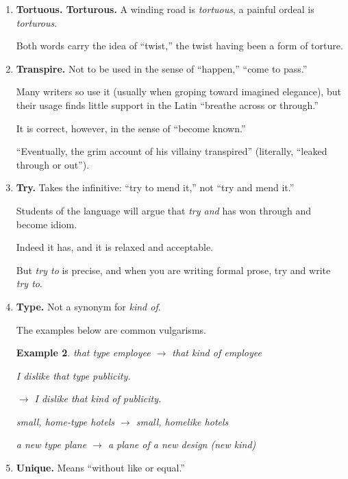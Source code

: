 \documentclass{article}
\newtheorem{example}{Example}
\begin{document}
\begin{enumerate}
	Use it sparingly.
	
	Save it for specific application.
	\begin{example}
		Our reorganization plan has a tremendous thrust.
		
		$\to$ The piston has a 5-inch thrust.
		
		The thrust of his letter was that he was working more hours than he'd bargained for.
		
		$\to$ The point he made in his letter was that he was working more hours than he'd bargained for.
	\end{example}
	\item {\bf Tortuous. Torturous.} A winding road is {\it tortuous}, a painful ordeal is {\it torturous}.
	
	Both words carry the idea of ``twist,'' the twist having been a form of torture.
	\item {\bf Transpire.} Not to be used in the sense of ``happen,'' ``come to pass.''
	
	Many writers so use it (usually when groping toward imagined elegance), but their usage finds little support in the Latin ``breathe across or through.''
	
	It is correct, however, in the sense of ``become known.''
	
	``Eventually, the grim account of his villainy transpired'' (literally, ``leaked through or out'').
	\item {\bf Try.} Takes the infinitive: ``try to mend it,'' not ``try and mend it.''
	
	Students of the language will argue that {\it try and} has won through and become idiom.
	
	Indeed it has, and it is relaxed and acceptable.
	
	But {\it try to} is precise, and when you are writing formal prose, try and write {\it try to}.
	\item {\bf Type.} Not a synonym for {\it kind of}.
	
	The examples below are common vulgarisms.
	\begin{example}
		that type employee $\to$ that kind of employee
		
		I dislike that type publicity.
		
		$\to$ I dislike that kind of publicity.
		
		small, home-type hotels $\to$ small, homelike hotels
		
		a new type plane $\to$ a plane of a new design (new kind)
	\end{example}
	\item {\bf Unique.} Means ``without like or equal.''
	

\end{enumerate}
\end{document}
